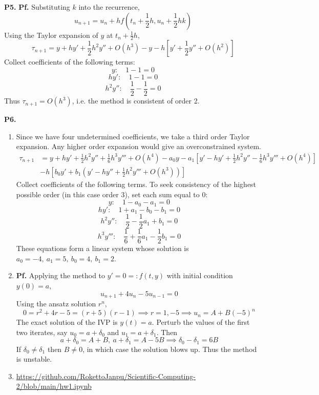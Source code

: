 \documentclass{article}
\def\tbf#1{\textbf{#1}}
\newcommand{\br}[1]{\left(#1\right)}
\newcommand{\sbr}[1]{\left[#1\right]}
\newcommand{\pf}{\tbf{Pf. }}
\newcommand{\imp}{\implies}
\newcommand{\sep}[1][.5cm]{\vspace{#1}}
\begin{document}
\tbf{P5.} \pf Substituting $k$ into the recurrence,
$$u_{n+1} = u_n + hf\br{t_n+\frac12h,u_n+\frac12hk}$$
Using the Taylor expansion of $y$ at $t_n+\frac12h$,
$$\tau_{n+1} = y + hy' + \frac12h^2y'' + O(h^3) - y - h\sbr{y' + \frac12y'' + O(h^2)}$$
Collect coefficients of the following terms:
$$y: \quad 1 - 1 = 0$$
$$hy': \quad 1 - 1 = 0$$
$$h^2y'': \quad \frac12 - \frac12 = 0$$
Thus $\tau_{n+1}=O(h^3)$, i.e. the method is consistent of order 2.
\sep



\tbf{P6.}

\begin{enumerate}[label=(\alph*)]
	
\item Since we have four undetermined coefficients, we take a third order Taylor expansion. Any higher order expansion would give an overconstrained system.
\begin{align*}
	\tau_{n+1} &= y + hy' + \frac12h^2y'' + \frac16h^3y''' + O(h^4) - a_0y - a_1\sbr{y' - hy' + \frac12h^2y'' - \frac16h^3y''' + O(h^4)}\\
	& - h\sbr{b_0y' + b_1\br{y' - hy'' + \frac12h^2y''' + O(h^3)}}
\end{align*}
Collect coefficients of the following terms. To seek consistency of the highest possible order (in this case order 3), set each sum equal to 0:
$$y: \quad 1 - a_0 - a_1 = 0$$
$$hy': \quad 1 + a_1 - b_0 - b_1 = 0$$
$$h^2y'': \quad \frac12 - \frac12a_1 + b_1 = 0$$
$$h^3y''': \quad \frac16+ \frac16a_1 - \frac12b_1 = 0$$
These equations form a linear system whose solution is $a_0=-4,~a_1=5,~b_0=4,~b_1=2$.


\item \pf Applying the method to $y'=0=:f(t,y)$ with initial condition $y(0)=a$,
$$u_{n+1} + 4u_n - 5u_{n-1} = 0$$
Using the ansatz solution $r^n$,
$$0 = r^2+4r-5 = (r+5)(r-1)
\imp r=1,-5
\imp u_n = A + B(-5)^n$$
The exact solution of the IVP is $y(t)=a$. Perturb the values of the first two iterates, say $u_0=a+\delta_0$ and $u_1=a+\delta_1$. Then
$$a+\delta_0 = A+B,~a+\delta_1 = A-5B
\imp \delta_0 - \delta_1 = 6B$$
If $\delta_0\ne\delta_1$ then $B\ne0$, in which case the solution blows up. Thus the method is unstable.


\item \url{https://github.com/RokettoJanpu/Scientific-Computing-2/blob/main/hw1.ipynb}

\end{enumerate}
\end{document}
